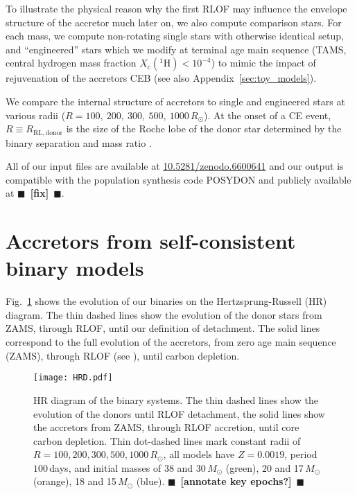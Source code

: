 \documentclass[twocolumn,twocolappendix,trackchanges]{aastex63}
\DeclareRobustCommand{\Figref}[1]{Fig.~\ref{#1}}
\newcommand{\todo}[1]{{\large $\blacksquare$~\textbf{\color{red}[#1]}}~$\blacksquare$}
\begin{document}
To illustrate the physical reason why the first RLOF may influence the
envelope structure of the accretor much later on, we also compute
comparison stars. For each mass, we compute non-rotating single stars
with otherwise identical setup, and ``engineered'' stars which we
modify at terminal age main sequence (TAMS, central hydrogen mass
fraction $X_\mathrm{c}(^1\mathrm{H})<10^{-4}$) to mimic the impact of
rejuvenation of the accretors CEB (see also Appendix~\ref{sec:toy_models}).

We compare the internal structure of accretors to single and
engineered stars at various radii
($R=100,\ 200,\ 300,\ 500,\ 1000\,R_\odot$). At the onset of a CE event,
$R\equiv R_\mathrm{RL, donor}$ is the size of the Roche lobe of the
donor star determined by the binary separation and mass ratio
\citep[e.g.,][]{paczynski:1971, eggleton:83}.%

All of our input files are available at \url{10.5281/zenodo.6600641}
and our output is compatible with the population synthesis code
POSYDON \citep{fragos:2022} and publicly available at \todo{fix}.



\section{Accretors from self-consistent binary models}
\label{sec:bin_models}

\Figref{fig:HRD} shows the evolution of our binaries on the
Hertzsprung-Russell (HR) diagram. The thin dashed lines %
show the evolution of the donor stars \citep[see also, e.g.,][]{yoon:2017,
  gotberg:2017, gotberg:2018, laplace:2020, laplace:2021} from ZAMS,
through RLOF, until our definition of detachment. The solid
lines correspond to the full evolution of the accretors, from zero age
main sequence (ZAMS), through RLOF (see \citealt{sravan:2019,
  renzo:2021zoph, wang:2020}), until carbon depletion. %

\begin{figure}[htbp]
  \texttt{[image: HRD.pdf]}
  \caption{HR diagram of the binary systems. The thin dashed lines
    show the evolution of the donors until RLOF detachment, the solid
    lines show the accretors from ZAMS, through RLOF accretion, until
    core carbon depletion. Thin dot-dashed lines mark constant radii
    of $R=100, 200, 300, 500, 1000\,R_\odot$, all models have
    $Z=0.0019$, period $100$\,days, and initial masses of 38 and
    30\,$M_\odot$ (green), 20 and 17\,$M_\odot$ (orange), 18 and
    15\,$M_\odot$ (blue). \todo{annotate key epochs?}}
  \label{fig:HRD}
\end{figure}
\end{document}
